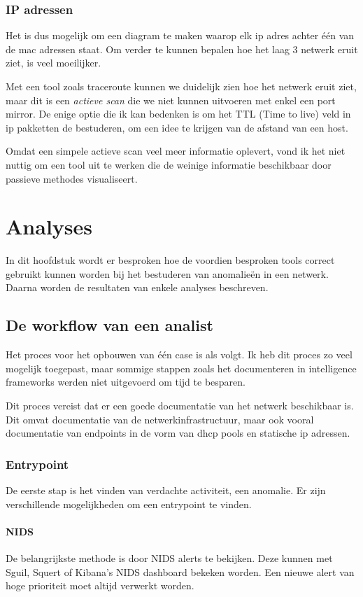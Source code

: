 \documentclass[a4paper,12pt]{report}
\begin{document}
\subsection{IP adressen}
Het is dus mogelijk om een diagram te maken waarop elk ip adres achter één van de mac adressen staat.
Om verder te kunnen bepalen hoe het laag 3 netwerk eruit ziet, is veel moeilijker.

Met een tool zoals traceroute kunnen we duidelijk zien hoe het netwerk eruit ziet, maar dit is een \emph{actieve scan} die we niet kunnen uitvoeren met enkel een port mirror.
De enige optie die ik kan bedenken is om het TTL (Time to live) veld in ip pakketten de bestuderen, om een idee te krijgen van de afstand van een host.

Omdat een simpele actieve scan veel meer informatie oplevert, vond ik het niet nuttig om een tool uit te werken die de weinige informatie beschikbaar door passieve methodes visualiseert.

\chapter{Analyses}
In dit hoofdstuk wordt er besproken hoe de voordien besproken tools correct gebruikt kunnen worden bij het bestuderen van anomalieën in een netwerk.
Daarna worden de resultaten van enkele analyses beschreven.

\section{De workflow van een analist}
Het proces voor het opbouwen van één case is als volgt.
Ik heb dit proces zo veel mogelijk toegepast, maar sommige stappen zoals het documenteren in intelligence frameworks werden niet uitgevoerd om tijd te besparen.

Dit proces vereist dat er een goede documentatie van het netwerk beschikbaar is.
Dit omvat documentatie van de netwerkinfrastructuur, maar ook vooral documentatie van endpoints in de vorm van dhcp pools en statische ip adressen.

\subsection{Entrypoint}
De eerste stap is het vinden van verdachte activiteit, een anomalie.
Er zijn verschillende mogelijkheden om een entrypoint te vinden.

\subsubsection{NIDS}
De belangrijkste methode is door NIDS alerts te bekijken.
Deze kunnen met Sguil, Squert of Kibana's NIDS dashboard bekeken worden.
Een nieuwe alert van hoge prioriteit moet altijd verwerkt worden.
\end{document}
